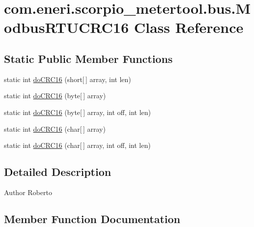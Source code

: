 \hypertarget{classcom_1_1eneri_1_1scorpio__metertool_1_1bus_1_1_modbus_r_t_u_c_r_c16}{}\section{com.\+eneri.\+scorpio\+\_\+metertool.\+bus.\+Modbus\+R\+T\+U\+C\+R\+C16 Class Reference}
\label{classcom_1_1eneri_1_1scorpio__metertool_1_1bus_1_1_modbus_r_t_u_c_r_c16}
\subsection*{Static Public Member Functions}
\begin{DoxyCompactItemize}
\item 
static int \hyperlink{classcom_1_1eneri_1_1scorpio__metertool_1_1bus_1_1_modbus_r_t_u_c_r_c16_a12a7827eaf09ef4635b56753719be5c0}{do\+C\+R\+C16} (short\mbox{[}$\,$\mbox{]} array, int len)
\item 
static int \hyperlink{classcom_1_1eneri_1_1scorpio__metertool_1_1bus_1_1_modbus_r_t_u_c_r_c16_a3e58d3e33002f24df3cecf1d69971db6}{do\+C\+R\+C16} (byte\mbox{[}$\,$\mbox{]} array)
\item 
static int \hyperlink{classcom_1_1eneri_1_1scorpio__metertool_1_1bus_1_1_modbus_r_t_u_c_r_c16_ad72a7cff6f406afead8ae55b7759717a}{do\+C\+R\+C16} (byte\mbox{[}$\,$\mbox{]} array, int off, int len)
\item 
static int \hyperlink{classcom_1_1eneri_1_1scorpio__metertool_1_1bus_1_1_modbus_r_t_u_c_r_c16_abba5205f7d7331c4e0e163a8f689601a}{do\+C\+R\+C16} (char\mbox{[}$\,$\mbox{]} array)
\item 
static int \hyperlink{classcom_1_1eneri_1_1scorpio__metertool_1_1bus_1_1_modbus_r_t_u_c_r_c16_a0db674d271e61cca302d46bee7cca1b3}{do\+C\+R\+C16} (char\mbox{[}$\,$\mbox{]} array, int off, int len)
\end{DoxyCompactItemize}


\subsection{Detailed Description}
\begin{DoxyAuthor}{Author}
Roberto 
\end{DoxyAuthor}


\subsection{Member Function Documentation}
\mbox{\label{classcom_1_1eneri_1_1scorpio__metertool_1_1bus_1_1_modbus_r_t_u_c_r_c16_a12a7827eaf09ef4635b56753719be5c0}} 
